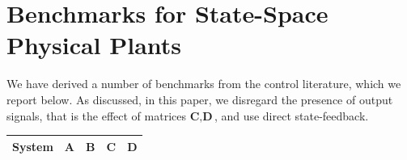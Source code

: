 \documentclass[runningheads,a4paper]{llncs}
\begin{document}
\newpage

\section{Benchmarks for State-Space Physical Plants}
\label{sec:BenchmarksforStateSpace}

We have derived a number of benchmarks from the control literature, which we report below. 
As discussed, in this paper, we disregard the presence of output signals, that is the effect of matrices $\textbf{C}, \textbf{D}$, and use
direct state-feedback. 
%

\begin{table}[htb]
\centering
\footnotesize
\begin{tabular}{|c|c|c|c|c|}
\hline
\textbf{System}                                                               & \textbf{A} & \textbf{B} & \textbf{C} & \textbf{D} \\ \hline

\end{tabular}
\end{table}
\end{document}
